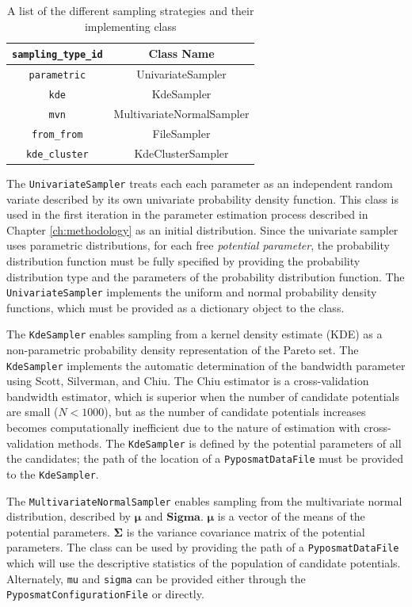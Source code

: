 \begin{table}[ht]
	\centering
	\caption{A list of the different sampling strategies and their implementing class}
	\label{tbl:pyposmat_samplers}
	\begin{tabular}{cc}
		\hline
		\verb|sampling_type_id| & Class Name \\
		\hline
		\verb|parametric| & UnivariateSampler \\
		\verb|kde| & KdeSampler \\
		\verb|mvn| & MultivariateNormalSampler \\
		\verb|from_from| & FileSampler \\
		\verb|kde_cluster| & KdeClusterSampler \\
		\hline
	\end{tabular}
\end{table}

The \verb|UnivariateSampler| treats each each parameter as an independent random variate described by its own univariate probability density function.  This class is used in the first iteration in the parameter estimation process described in Chapter \ref{ch:methodology} as an initial distribution.  Since the univariate sampler uses parametric distributions, for each free \emph{potential parameter}, the probability distribution function must be fully specified by providing the probability distribution type and the parameters of the probability distribution function.  The \verb|UnivariateSampler| implements the uniform and normal probability density functions, which must be provided as a dictionary object to the class.

The \verb|KdeSampler| enables sampling from a kernel density estimate (KDE) as a non-parametric probability density representation of the Pareto set.  The \verb|KdeSampler| implements the automatic determination of the bandwidth parameter using Scott, Silverman, and Chiu.  The Chiu estimator is a cross-validation bandwidth estimator, which is superior when the number of candidate potentials are small ($N<1000$), but as the number of candidate potentials increases becomes computationally inefficient due to the nature of estimation with cross-validation methods.  The \verb|KdeSampler| is defined by the potential parameters of all the candidates; the path of the location of a \verb|PyposmatDataFile| must be provided to the \verb|KdeSampler|.

The \verb|MultivariateNormalSampler| enables sampling from the multivariate normal distribution, described by $\bm{\mu}$ and $\bm{Sigma}$. $\bm{\mu}$ is a vector of the means of the potential parameters. $\bm{\Sigma}$ is the variance covariance matrix of the potential parameters.  The class can be used by providing the path of a \verb|PyposmatDataFile| which will use the descriptive statistics of the population of candidate potentials.
Alternately, \verb|mu| and \verb|sigma| can be provided either through the \verb|PyposmatConfigurationFile| or directly.


